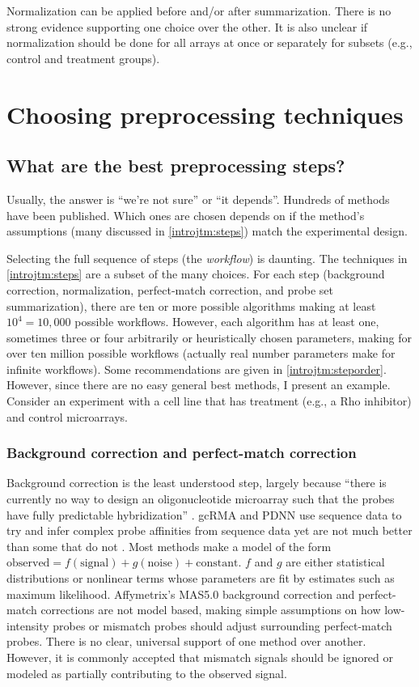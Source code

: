 Normalization can be applied before and/or after summarization.
There is no strong evidence supporting one choice over the other.
It is also unclear if normalization should be done for all arrays at once
or separately for subsets (e.g., control and treatment groups).

\section{Choosing preprocessing techniques}

\subsection{What are the best preprocessing steps?}

Usually, the answer is ``we're not sure'' or ``it depends''. 
Hundreds of methods have been published.
Which ones are chosen depends on if the method's assumptions (many
discussed in \ref{introjtm:steps}) match
the experimental design.

Selecting the full sequence of steps (the \textit{workflow}) is daunting.
The techniques in \ref{introjtm:steps} are a subset of the many choices.
For each step (background correction, normalization,
perfect-match correction, and probe set summarization), there are
ten or more possible algorithms making at least $10^4=10,000$ possible
workflows. However, each algorithm has at least one, sometimes
three or four arbitrarily or heuristically chosen parameters, making
for over ten million possible workflows (actually real number parameters make 
for infinite workflows).
Some recommendations are given in \ref{introjtm:steporder}.
However, since there are no easy general best methods, I present an example. 
Consider an experiment with a cell line that has
treatment (e.g., a Rho inhibitor) and control microarrays. 

\subsubsection{Background correction and perfect-match correction}
Background correction is the least understood step, largely because
``there is currently no way to design 
an oligonucleotide microarray such that the probes have 
fully predictable hybridization'' \cite{Pozhitkov:2007go}.
gcRMA and PDNN use sequence data to try and infer complex
probe affinities from sequence data yet are not much better than
some that do not \cite{Irizarry:2003ge,Zhang:2003to,Wu:2004wh}.
Most methods make a model of the form $\text{observed}=f(\text{signal})
+ g(\text{noise}) + \text{constant}$. $f$ and $g$ are either statistical
distributions or nonlinear terms whose parameters are fit
by estimates such as maximum likelihood. 
Affymetrix's MAS5.0 background correction and perfect-match corrections
are not model based, making simple assumptions on how low-intensity probes
or mismatch probes should adjust surrounding perfect-match probes.
There is no clear, universal support
of one method over another. However, it is commonly accepted that 
mismatch signals should be ignored or modeled as partially 
contributing to the observed signal.

